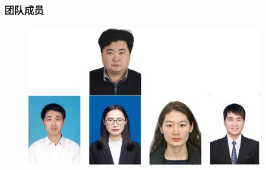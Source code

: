%
%
\frame
{
	\frametitle{团队成员}
\begin{figure}[h!]
\vspace*{-0.10in}
\centering
\includegraphics[height=2.40in,width=4.00in,viewport=0 0 430 270,clip]{Figures/Team_Member.png}
\label{Team_Membwe}
\end{figure}
}
